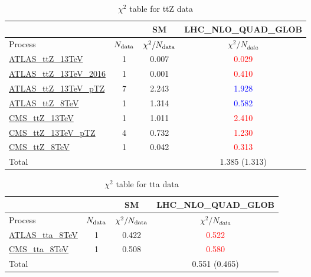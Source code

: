 \documentclass{article}
\begin{document}
\begin{table}[H]
\centering
\begin{tabular}{|l|c|c|c|}
\hline
 \multicolumn{2}{|c|}{} & SM& LHC_NLO_QUAD_GLOB\\ \hline
Process & $N_{\rm data}$ & $\chi^ 2/N_{\rm data}$& $\chi^ 2/N_{data}$\\ \hline
\href{https://arxiv.org}{ATLAS_ttZ_13TeV} & 1 & 0.007 & \textcolor{red}                            {0.029} \\ \hline
\href{https://arxiv.org}{ATLAS_ttZ_13TeV_2016} & 1 & 0.001 & \textcolor{red}                            {0.410} \\ \hline
\href{https://arxiv.org}{ATLAS_ttZ_13TeV_pTZ} & 7 & 2.243 & \textcolor{blue}                            {1.928} \\ \hline
\href{https://arxiv.org}{ATLAS_ttZ_8TeV} & 1 & 1.314 & \textcolor{blue}                            {0.582} \\ \hline
\href{https://arxiv.org}{CMS_ttZ_13TeV} & 1 & 1.011 & \textcolor{red}                            {2.410} \\ \hline
\href{https://arxiv.org}{CMS_ttZ_13TeV_pTZ} & 4 & 0.732 & \textcolor{red}                            {1.230} \\ \hline
\href{https://arxiv.org}{CMS_ttZ_8TeV} & 1 & 0.042 & \textcolor{red}                            {0.313} \\ \hline
\hline Total & &  & 1.385 (1.313) \\ \hline
\end{tabular}
\caption{$\chi^2$ table for ttZ data}
\end{table}
\begin{table}[H]
\centering
\begin{tabular}{|l|c|c|c|}
\hline
 \multicolumn{2}{|c|}{} & SM& LHC_NLO_QUAD_GLOB\\ \hline
Process & $N_{\rm data}$ & $\chi^ 2/N_{\rm data}$& $\chi^ 2/N_{data}$\\ \hline
\href{https://arxiv.org}{ATLAS_tta_8TeV} & 1 & 0.422 & \textcolor{red}                            {0.522} \\ \hline
\href{https://arxiv.org}{CMS_tta_8TeV} & 1 & 0.508 & \textcolor{red}                            {0.580} \\ \hline
\hline Total & &  & 0.551 (0.465) \\ \hline
\end{tabular}
\caption{$\chi^2$ table for tta data}
\end{table}
\end{document}
